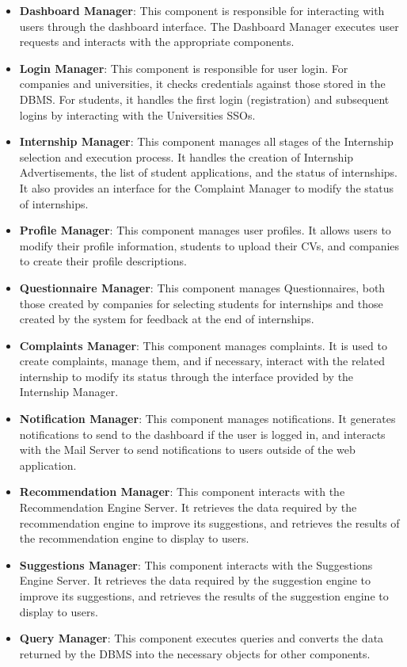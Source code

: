 \begin{itemize}
      \item \textbf{Dashboard Manager}: This component is responsible for interacting with users through the dashboard interface.
            The Dashboard Manager executes user requests and interacts with the appropriate components.
      \item \textbf{Login Manager}: This component is responsible for user login. For companies and universities,
            it checks credentials against those stored in the DBMS. For students, it handles the first login (registration)
            and subsequent logins by interacting with the Universities SSOs.
      \item \textbf{Internship Manager}: This component manages all stages of the Internship selection and execution process.
            It handles the creation of Internship Advertisements, the list of student applications,
            and the status of internships. It also provides an interface for the Complaint Manager to modify the status of internships.
      \item \textbf{Profile Manager}: This component manages user profiles. It allows users to modify their profile information,
            students to upload their CVs, and companies to create their profile descriptions.
      \item \textbf{Questionnaire Manager}: This component manages Questionnaires, both those created by companies for selecting students for internships
            and those created by the system for feedback at the end of internships.
      \item \textbf{Complaints Manager}: This component manages complaints. It is used to create complaints, manage them, and if necessary,
            interact with the related internship to modify its status through the interface provided by the Internship Manager.
      \item \textbf{Notification Manager}: This component manages notifications. It generates notifications to send to the
            dashboard if the user is logged in, and interacts with the Mail Server to send notifications to users outside of the web application.
      \item \textbf{Recommendation Manager}: This component interacts with the Recommendation Engine Server. It retrieves the data
            required by the recommendation engine to improve its suggestions, and retrieves the results of the recommendation engine to display to users.
      \item \textbf{Suggestions Manager}: This component interacts with the Suggestions Engine Server. It retrieves the data
            required by the suggestion engine to improve its suggestions, and retrieves the results of the suggestion engine to display to users.
      \item \textbf{Query Manager}: This component executes queries and converts the data returned by the DBMS into the necessary objects for other components.
\end{itemize}

